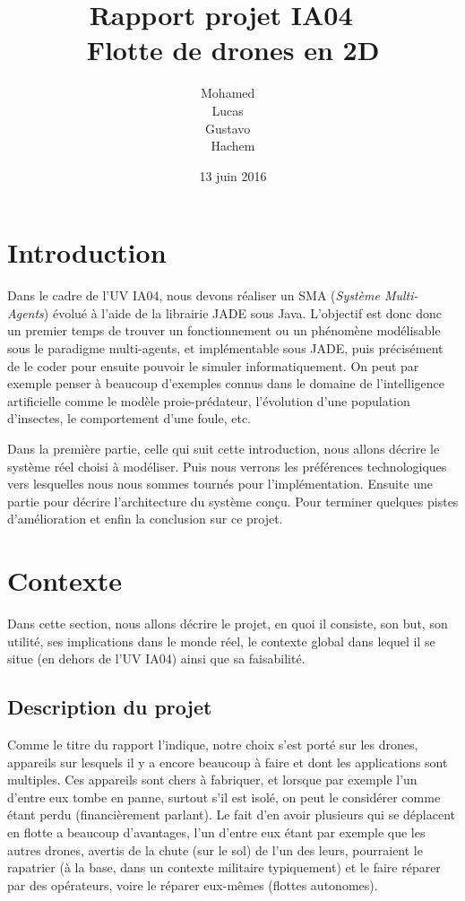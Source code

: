 \documentclass[11pt]{report}
\title{Rapport projet IA04 ~\\ Flotte de drones en 2D}
\author
{
	Mohamed \bsc{Baaziz} ~\\ 
	Lucas \bsc{Sorin} ~\\ 
	Gustavo \bsc{Cabrera} ~\\ 
	Hachem \bsc{Benyahia}
}
\date{13 juin 2016}
\begin{document}
\maketitle
\renewcommand{\contentsname}{\centering Sommaire \vspace*{1cm}}
\tableofcontents

\newpage

\section{Introduction}

Dans le cadre de l'UV IA04, nous devons réaliser un SMA (\textit{Système Multi-Agents}) évolué à l'aide de la librairie JADE sous Java. L'objectif est donc donc un premier temps de trouver un fonctionnement ou un phénomène modélisable sous le paradigme multi-agents, et implémentable sous JADE, puis précisément de le coder pour ensuite pouvoir le simuler informatiquement. On peut par exemple penser à beaucoup d'exemples connus dans le domaine de l'intelligence artificielle comme le modèle proie-prédateur, l'évolution d'une population d'insectes, le comportement d'une foule, etc. 

Dans la première partie, celle qui suit cette introduction, nous allons décrire le système réel choisi à modéliser. Puis nous verrons les préférences technologiques vers lesquelles nous nous sommes tournés pour l'implémentation. Ensuite une partie pour décrire l'architecture du système conçu. Pour terminer quelques pistes d'amélioration et enfin la conclusion sur ce projet.

\section{Contexte}

Dans cette section, nous allons décrire le projet, en quoi il consiste, son but, son utilité, ses implications dans le monde réel, le contexte global dans lequel il se situe (en dehors de l'UV IA04) ainsi que sa faisabilité.

\subsection{Description du projet}

Comme le titre du rapport l'indique, notre choix s'est porté sur les drones, appareils sur lesquels il y a encore beaucoup à faire et dont les applications sont multiples. Ces appareils sont chers à fabriquer, et lorsque par exemple l'un d'entre eux tombe en panne, surtout s'il est isolé, on peut le considérer comme étant perdu (financièrement parlant). Le fait d'en avoir plusieurs qui se déplacent en flotte a beaucoup d'avantages, l'un d'entre eux étant par exemple que les autres drones, avertis de la chute (sur le sol) de l'un des leurs, pourraient le rapatrier (à la base, dans un contexte militaire typiquement) et le faire réparer par des opérateurs, voire le réparer eux-mêmes (flottes autonomes).
\end{document}
